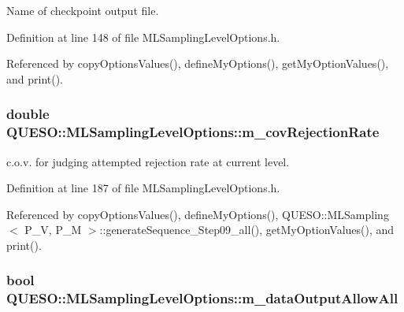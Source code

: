 Name of checkpoint output file. 



Definition at line 148 of file M\-L\-Sampling\-Level\-Options.\-h.



Referenced by copy\-Options\-Values(), define\-My\-Options(), get\-My\-Option\-Values(), and print().

\hypertarget{class_q_u_e_s_o_1_1_m_l_sampling_level_options_a8efaf9dfed7ff9f87c9a40aa8e8217a8}{
\subsubsection[{m\-\_\-cov\-Rejection\-Rate}]{\setlength{\rightskip}{0pt plus 5cm}double Q\-U\-E\-S\-O\-::\-M\-L\-Sampling\-Level\-Options\-::m\-\_\-cov\-Rejection\-Rate}}\label{class_q_u_e_s_o_1_1_m_l_sampling_level_options_a8efaf9dfed7ff9f87c9a40aa8e8217a8}


c.\-o.\-v. for judging attempted rejection rate at current level. 



Definition at line 187 of file M\-L\-Sampling\-Level\-Options.\-h.



Referenced by copy\-Options\-Values(), define\-My\-Options(), Q\-U\-E\-S\-O\-::\-M\-L\-Sampling$<$ P\-\_\-\-V, P\-\_\-\-M $>$\-::generate\-Sequence\-\_\-\-Step09\-\_\-all(), get\-My\-Option\-Values(), and print().

\hypertarget{class_q_u_e_s_o_1_1_m_l_sampling_level_options_ad6a290719785a151c5876bb04145442a}{
\subsubsection[{m\-\_\-data\-Output\-Allow\-All}]{\setlength{\rightskip}{0pt plus 5cm}bool Q\-U\-E\-S\-O\-::\-M\-L\-Sampling\-Level\-Options\-::m\-\_\-data\-Output\-Allow\-All}}\label{class_q_u_e_s_o_1_1_m_l_sampling_level_options_ad6a290719785a151c5876bb04145442a}


